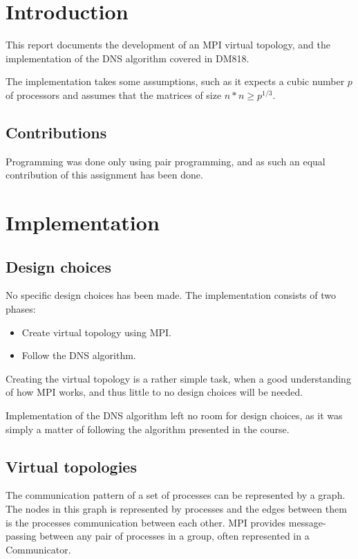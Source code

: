 \documentclass[a4paper,11pt,oneside]{book}
\begin{document}
\pagestyle{ruled}
\chapter{Introduction}
\setcounter{section}{1}
This report documents the development of an MPI virtual topology, and the implementation of the DNS algorithm covered in DM818.

The implementation takes some assumptions, such as it expects a cubic number $p$ of processors and assumes that the matrices of size $n*n \geq p^{1/3}$.

\section{Contributions}
Programming was done only using pair programming, and as such an equal contribution of this assignment has been done.

\chapter{Implementation}
\section{Design choices}
No specific design choices has been made. The implementation consists of two phases:
\begin{itemize}
\item Create virtual topology using MPI.
\item Follow the DNS algorithm.
\end{itemize}

Creating the virtual topology is a rather simple task, when a good understanding of how MPI works, and thus little to no design choices will be needed. 

Implementation of the DNS algorithm left no room for design choices, as it was simply a matter of following the algorithm presented in the course.

\section{Virtual topologies}
The communication pattern of a set of processes can be represented by a graph. The nodes in this graph is represented by processes and the edges between them is the processes communication between each other. MPI provides message-passing between any pair of processes in a group, often represented in a Communicator.
\end{document}
